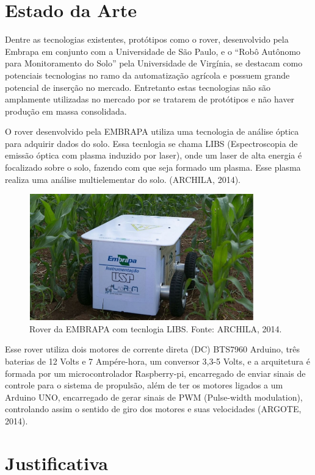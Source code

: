 \section{Estado da Arte}

Dentre as tecnologias existentes, protótipos como o rover, desenvolvido pela Embrapa em conjunto com a Universidade de São Paulo, e o “Robô Autônomo para Monitoramento do Solo” pela Universidade de Virgínia, se destacam como potenciais tecnologias no ramo da automatização agrícola e possuem grande potencial de inserção no mercado.  Entretanto estas tecnologias não são amplamente utilizadas no mercado por se tratarem de protótipos e não haver produção em massa consolidada.

O rover desenvolvido pela EMBRAPA utiliza uma tecnologia de análise óptica para adquirir dados do solo. Essa tecnlogia se chama LIBS (Espectroscopia de emissão óptica com plasma induzido por laser), onde um laser de alta energia é focalizado sobre o solo, fazendo com que seja formado um plasma. Esse plasma realiza uma análise multielementar do solo. (ARCHILA, 2014).

\clearpage

\begin{figure}[!htb]
	\centering
	\label{figura1}
	\includegraphics[scale=0.6]{figuras/figura1}
	\caption{Rover da EMBRAPA com tecnlogia LIBS. Fonte: ARCHILA, 2014.}
\end{figure}

Esse rover utiliza dois motores de corrente direta (DC) BTS7960 Arduino, três baterias de 12 Volts e 7 Ampére-hora, um conversor 3,3-5 Volts, e a arquitetura é formada por um microcontrolador Raspberry-pi, encarregado de enviar sinais de controle para o sistema de propulsão, além de ter os motores ligados a um Arduino UNO, encarregado de gerar sinais de PWM (Pulse-width modulation), controlando assim o sentido de giro dos motores e suas velocidades (ARGOTE, 2014).

\section{Justificativa}

